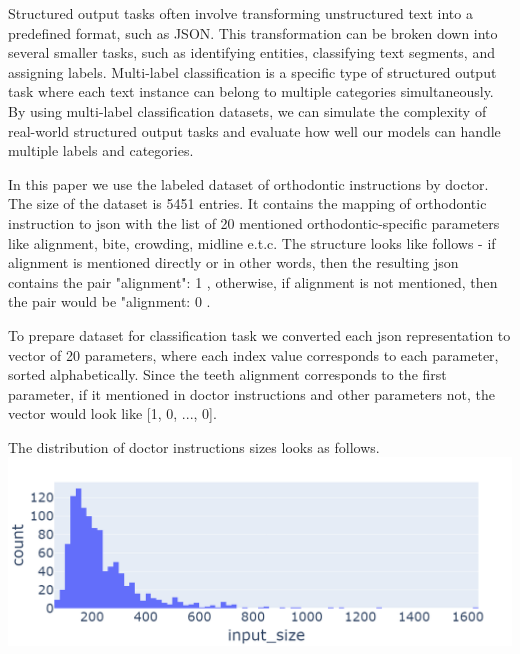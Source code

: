 \documentclass[11pt]{article}
\begin{document}
Structured output tasks often involve transforming unstructured text into a predefined format, such as JSON. This transformation can be broken down into several smaller tasks, such as identifying entities, classifying text segments, and assigning labels. Multi-label classification is a specific type of structured output task where each text instance can belong to multiple categories simultaneously. By using multi-label classification datasets, we can simulate the complexity of real-world structured output tasks and evaluate how well our models can handle multiple labels and categories.

In this paper we use the labeled dataset of orthodontic instructions by doctor. The size of the dataset is 5451 entries. It contains the mapping of orthodontic instruction to json with the list of 20 mentioned orthodontic-specific parameters like alignment, bite, crowding, midline e.t.c. The structure looks like follows - if alignment is mentioned directly or in other words, then the resulting json contains the pair { "alignment": 1 }, otherwise, if alignment is not mentioned, then the pair would be { "alignment: 0 }.

To prepare dataset for classification task we converted each json representation to vector of 20 parameters, where each index value corresponds to each parameter, sorted alphabetically. Since the teeth alignment corresponds to the first parameter, if it mentioned in doctor instructions and other parameters not, the vector would look like [1, 0, ..., 0].

The distribution of doctor instructions sizes looks as follows.
\includegraphics[scale=0.2]{images/dataset_length.png}
\end{document}
